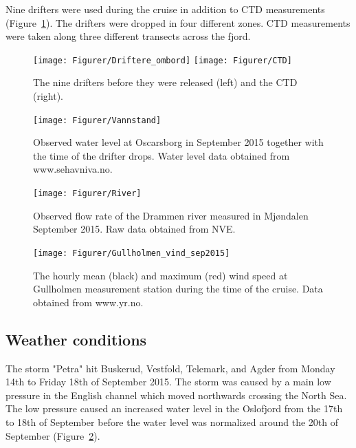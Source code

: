 \documentclass[12pt,a4paper,english]{article}
\begin{document}
Nine drifters were used during the cruise in addition to CTD measurements (Figure~\ref{fig:Utstyr}). The drifters were dropped in four different zones. CTD measurements were taken along three different transects across the fjord. %

\begin{figure}[b]
\centerline{
\texttt{[image: Figurer/Driftere\_ombord]}
\texttt{[image: Figurer/CTD]}
}
\caption{\small
The nine drifters before they were released (left) and the CTD (right).}
\label{fig:Utstyr}
\end{figure}

\begin{figure}[tb]
\centerline{
\texttt{[image: Figurer/Vannstand]}}
\caption{\small
Observed water level at Oscarsborg in September 2015 together with the time of the drifter drops. Water level data obtained from www.sehavniva.no.}
\label{fig:Waterlevel}
\end{figure}

\begin{figure}[tb]
\centerline{
\texttt{[image: Figurer/River]}}
\caption{\small
Observed flow rate of the Drammen river measured in Mj\o ndalen September 2015. Raw data obtained from NVE.}%
\label{fig:River}
\end{figure}

\begin{figure}[tb]
\centerline{
\texttt{[image: Figurer/Gullholmen\_vind\_sep2015]}}
\caption{\small
The hourly mean (black) and maximum (red) wind speed at Gullholmen measurement station during the time of the cruise. Data obtained from www.yr.no.}
\label{fig:Wind}
\end{figure}


\subsection{Weather conditions}

The storm "Petra" hit Buskerud, Vestfold, Telemark, and Agder from Monday 14th to Friday 18th of September 2015. The storm was caused by a main low pressure in the English channel which moved northwards crossing the North Sea. The low pressure caused an increased water level in the Oslofjord from the 17th to 18th of September before the water level was normalized around the 20th of September (Figure~\ref{fig:Waterlevel}).
\end{document}
